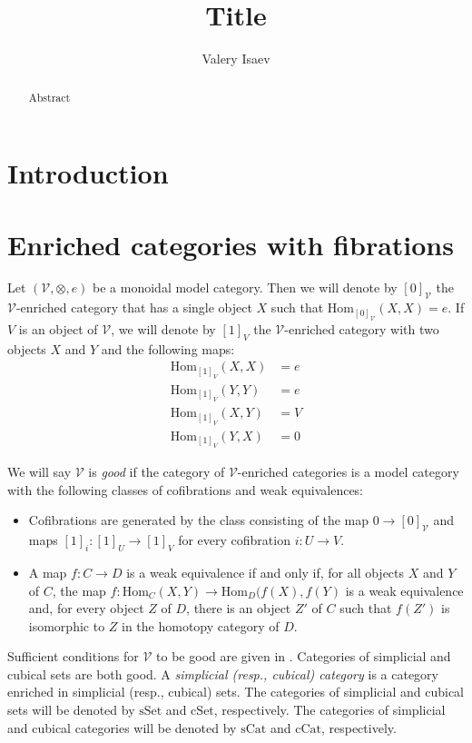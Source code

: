 \documentclass[reqno]{amsart}
\theoremstyle{definition}
\theoremstyle{remark}
\newcommand{\fs}[1]{\mathrm{#1}}
\newcommand{\Hom}{\fs{Hom}}
\newcommand{\cat}[1]{\mathcal{#1}}
\newcommand{\sSet}{\fs{sSet}}
\newcommand{\cSet}{\fs{cSet}}
\newcommand{\sCat}{\fs{sCat}}
\newcommand{\cCat}{\fs{cCat}}
\numberwithin{figure}{section}
\begin{document}
\title{Title}

\author{Valery Isaev}

\begin{abstract}
Abstract
\end{abstract}

\maketitle

\section{Introduction}

\section{Enriched categories with fibrations}

Let $(\cat{V},\otimes,e)$ be a monoidal model category.
Then we will denote by $[0]_\cat{V}$ the $\cat{V}$-enriched category that has a single object $X$ such that $\Hom_{[0]_\cat{V}}(X,X) = e$.
If $V$ is an object of $\cat{V}$, we will denote by $[1]_V$ the $\cat{V}$-enriched category with two objects $X$ and $Y$ and the following maps:
\begin{align*}
\Hom_{[1]_V}(X,X) & = e \\
\Hom_{[1]_V}(Y,Y) & = e \\
\Hom_{[1]_V}(X,Y) & = V \\
\Hom_{[1]_V}(Y,X) & = 0
\end{align*}

We will say $\cat{V}$ is \emph{good} if the category of $\cat{V}$-enriched categories is a model category with the following classes of cofibrations and weak equivalences:
\begin{itemize}
\item Cofibrations are generated by the class consisting of the map $0 \to [0]_\cat{V}$ and maps $[1]_i : [1]_U \to [1]_V$ for every cofibration $i : U \to V$.
\item A map $f : C \to D$ is a weak equivalence if and only if, for all objects $X$ and $Y$ of $C$, the map $f : \Hom_C(X,Y) \to \Hom_D(f(X),f(Y)$ is a weak equivalence
and, for every object $Z$ of $D$, there is an object $Z'$ of $C$ such that $f(Z')$ is isomorphic to $Z$ in the homotopy category of $D$.
\end{itemize}

Sufficient conditions for $\cat{V}$ to be good are given in \cite[Proposition~A.3.2.4]{lurie-topos}.
Categories of simplicial and cubical sets are both good.
A \emph{simplicial (resp., cubical) category} is a category enriched in simplicial (resp., cubical) sets.
The categories of simplicial and cubical sets will be denoted by $\sSet$ and $\cSet$, respectively.
The categories of simplicial and cubical categories will be denoted by $\sCat$ and $\cCat$, respectively.
\end{document}
